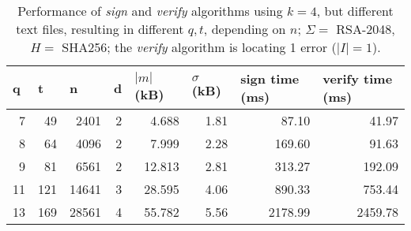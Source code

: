 \begin{table}[ht]
\centering
\begin{tabular}{rrrrrrrr}
\hline
\multicolumn{1}{|l|}{\textbf{q}} &
\multicolumn{1}{l|}{\textbf{t}} &
\multicolumn{1}{l|}{\textbf{n}} &
\multicolumn{1}{l|}{\textbf{d}} &
\multicolumn{1}{l|}{\textbf{$|m|$ (kB)}} &
\multicolumn{1}{l|}{\textbf{$\sigma$ (kB)}} &
\multicolumn{1}{l|}{\textbf{sign time (ms)}} &
\multicolumn{1}{l|}{\textbf{verify time (ms)}} \\ \hline
7                                & 49                              & 2401                            & 2                               & 4.688                                  & 1.81                                                       & 87.10                                        & 41.97                                           \\
8                                & 64                              & 4096                            & 2                               & 7.999                                  & 2.28                                                       & 169.60                                       & 91.63                                           \\
9                                & 81                              & 6561                            & 2                               & 12.813                                 & 2.81                                                       & 313.27                                       & 192.09                                          \\
11                               & 121                             & 14641                           & 3                               & 28.595                                 & 4.06                                                       & 890.33                                       & 753.44                                          \\
13                               & 169                             & 28561                           & 4                               & 55.782                                 & 5.56                                                       & 2178.99                                      & 2459.78                                        
\end{tabular}
\caption{Performance of \textit{sign} and \textit{verify} algorithms using $k = 4$, but different text files, resulting in different $q, t$, depending on $n$; $\Sigma = $ RSA-2048, $H = $ SHA256; the \textit{verify} algorithm is locating 1 error ($|I| = 1$).}
\label{table:performance-sign-locate-different-files}
\end{table}